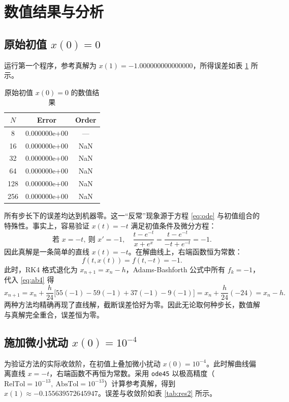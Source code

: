 \documentclass[12pt,a4paper]{article}
\begin{document}
\section{数值结果与分析}

\subsection{原始初值 $x(0)=0$}

运行第一个程序，参考真解为 $x(1) = -1.000000000000000$，所得误差如表 \ref{tab:res1} 所示。

\begin{table}[htbp]
    \centering
    \caption{原始初值 $x(0)=0$ 的数值结果}
    \label{tab:res1}
    \begin{tabular}{ccc}
        \toprule
        $N$ & Error & Order \\
        \midrule
        8   & 0.000000e+00 & ---   \\
        16  & 0.000000e+00 & NaN   \\
        32  & 0.000000e+00 & NaN   \\
        64  & 0.000000e+00 & NaN   \\
        128 & 0.000000e+00 & NaN   \\
        256 & 0.000000e+00 & NaN   \\
        \bottomrule
    \end{tabular}
\end{table}

所有步长下的误差均达到机器零。这一“反常”现象源于方程 \eqref{eq:ode} 与初值组合的特殊性。事实上，容易验证 $x(t) = -t$ 满足初值条件及微分方程：
\[
\text{若 } x = -t,\ \text{则 } x' = -1,\quad 
\frac{t - e^{-t}}{x + e^x} = \frac{t - e^{-t}}{-t + e^{-t}} = -1.
\]
因此真解是一条简单的直线 $x(t) = -t$。在解曲线上，右端函数恒为常数：
\[
f(t, x(t)) = f(t, -t) = -1.
\]
此时，RK4 格式退化为 $x_{n+1} = x_n - h$，Adams-Bashforth 公式中所有 $f_k = -1$，代入 \eqref{eq:ab4} 得
\[
x_{n+1} = x_n + \frac{h}{24}\bigl[55(-1) - 59(-1) + 37(-1) - 9(-1)\bigr] 
        = x_n + \frac{h}{24}(-24) = x_n - h.
\]
两种方法均精确再现了直线解，截断误差恰好为零。因此无论取何种步长，数值解与真解完全重合，误差恒为零。

\subsection{施加微小扰动 $x(0)=10^{-4}$}

为验证方法的实际收敛阶，在初值上叠加微小扰动 $x(0) = 10^{-4}$。此时解曲线偏离直线 $x = -t$，右端函数不再恒为常数。采用 \texttt{ode45} 以极高精度（$\text{RelTol}=10^{-13},\ \text{AbsTol}=10^{-13}$）计算参考真解，得到 $x(1) \approx -0.155639572645947$。误差与收敛阶如表 \ref{tab:res2} 所示。
\end{document}
